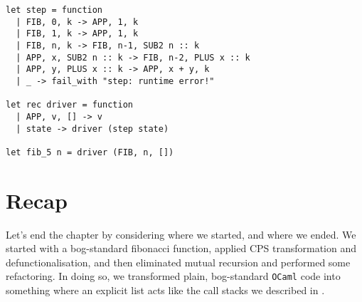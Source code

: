 \begin{code}
\label{code:fib-final}
\begin{verbatim}
let step = function
  | FIB, 0, k -> APP, 1, k
  | FIB, 1, k -> APP, 1, k
  | FIB, n, k -> FIB, n-1, SUB2 n :: k
  | APP, x, SUB2 n :: k -> FIB, n-2, PLUS x :: k
  | APP, y, PLUS x :: k -> APP, x + y, k
  | _ -> fail_with "step: runtime error!"

let rec driver = function
  | APP, v, [] -> v
  | state -> driver (step state)

let fib_5 n = driver (FIB, n, [])
\end{verbatim}
\end{code}


\section{Recap}
Let's end the chapter by considering where we started, and where we ended. We started with a bog-standard fibonacci function, applied CPS transformation and defunctionalisation, and then eliminated mutual recursion and performed some refactoring. In doing so, we transformed plain, bog-standard \texttt{OCaml} code into something where an explicit list acts like the call stacks we described in .